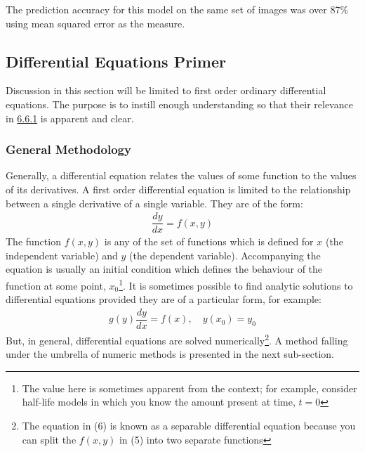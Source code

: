 \documentclass{article}
\begin{document}
\noindent The prediction accuracy for this model on the same set of images was over 87\% using mean squared error as the measure.


\subsection{Differential Equations Primer}
\label{sec:de}

\noindent Discussion in this section will be limited to first order ordinary differential equations. The purpose is to instill enough understanding so that their relevance in \hyperref[sec:neuralODE]{6.6.1} is apparent and clear.

\subsubsection{General Methodology}

\noindent Generally, a differential equation relates the values of some function to the values of its derivatives. A first order differential equation is limited to the relationship between a single derivative of a single variable. They are of the form:
\begin{align}
    \dfrac{dy}{dx} = f(x, y)
\end{align}
\noindent The function $f(x, y)$ is any of the set of functions which is defined for $x$ (the independent variable) and $y$ (the dependent variable). Accompanying the equation is usually an initial condition which defines the behaviour of the function at some point, $x_0$\footnote{The value here is sometimes apparent from the context; for example, consider half-life models in which you know the amount present at time, $t = 0$}. It is sometimes possible to find analytic solutions to differential equations provided they are of a particular form, for example:
\begin{align}
    g(y)\dfrac{dy}{dx} = f(x),\hspace{1em} y(x_0) = y_0
\end{align}
\noindent But, in general, differential equations are solved numerically\footnote{The equation in (6) is known as a separable differential equation because you can split the $f(x, y)$ in (5) into two separate functions}. A method falling under the umbrella of numeric methods is presented in the next sub-section. 
\end{document}
